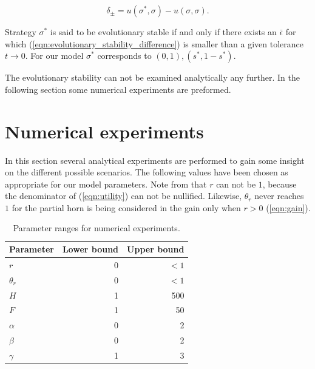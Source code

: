\documentclass[10pt]{article}
\begin{document}
\begin{equation}\label{eqn:evolutionary_stability_difference}
	 \delta_{\pm} = u(\sigma^*, \sigma) - u(\sigma, \sigma).
\end{equation}

Strategy \(\sigma^*\) is said to be evolutionary stable if and only if there exists
an \(\bar{\epsilon}\) for which (\ref{eqn:evolutionary_stability_difference}) is
smaller than a given tolerance \(t \rightarrow 0\).  For our model \(\sigma^*\) 
corresponds to \((0, 1), (s^*, 1 - s^*)\).

The evolutionary stability can not be examined analytically any further. In the 
following section some numerical experiments are preformed. 

\section{Numerical experiments}\label{section:numerical_experiments}

In this section several analytical experiments are performed to gain some insight 
on the different possible scenarios. The following values have been chosen as
appropriate for our model parameters. Note from that \(r\) can not be \(1\), because 
the denominator of (\ref{eqn:utility}) can not be nullified. Likewise,  \(\theta_r\)
never reaches \(1\) for the partial horn is being considered in the gain only when 
\(r>0\) (\ref{eqn:gain}). 

\begin{table}[!hbtp]
	\begin{center}
      \begin{tabular}{lrr}
            \toprule
            Parameter    	& Lower bound & Upper bound\\
            \midrule
            \(r\)				& 0				& \(< 1\)		\\
            \(\theta_r\)    	& 0				&  \(< 1\)		\\
            \(H\)              	& 1				& 500			\\
            \(F\)              	& 1				& 50			\\
            \(\alpha\)      	& 0				& 2				\\
            \(\beta\)        	& 0  	            & 2				\\
            \(\gamma\)  	& 1				& 3				\\
            \bottomrule
      \end{tabular}
      \caption{Parameter ranges for numerical experiments.}
      \label{tbl:paremeters}
  	\end{center}
\end{table}
\end{document}
